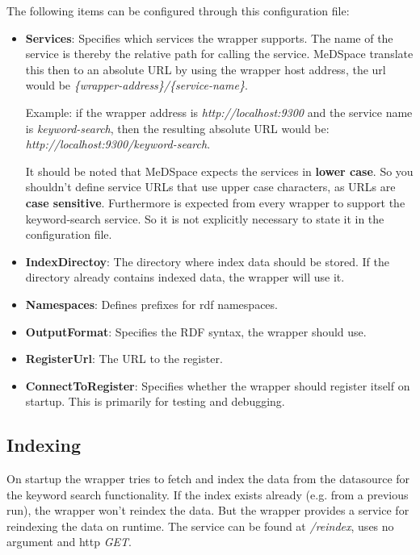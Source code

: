 The following items can be configured through this configuration file:
\begin{itemize}
\item \textbf{Services}: Specifies which services the wrapper supports. The name of the service is thereby the relative path for calling the service. MeDSpace translate this then to an absolute URL by using the wrapper host address, the url would be \emph{\{wrapper-address\}/\{service-name\}}. 

Example: if the wrapper address is \emph{http://localhost:9300} and the service  name is \emph{keyword-search}, then the resulting absolute URL would be: \emph{http://localhost:9300/keyword-search}. 

It should be noted that MeDSpace expects the services in \textbf{lower case}. So you shouldn't define service URLs that use upper case characters, as URLs are \textbf{case sensitive}.
Furthermore is expected from every wrapper to support the keyword-search service. So it is not explicitly necessary to state it in the configuration file.

\item \textbf{IndexDirectoy}: The directory where index data should be stored. If the directory already contains indexed data, the wrapper will use it.

\item \textbf{Namespaces}: Defines prefixes for rdf namespaces. 

\item \textbf{OutputFormat}: Specifies the RDF syntax, the wrapper should use.

\item \textbf{RegisterUrl}: The URL to the register.

\item \textbf{ConnectToRegister}: Specifies whether the wrapper should register itself on startup. This is primarily for testing and debugging.
\end{itemize}

\subsection{Indexing}

On startup the wrapper tries to fetch and index the data from the datasource for the keyword search functionality. If the index exists already (e.g. from a previous run), the wrapper won't reindex the data. But the wrapper provides a service for reindexing the data on runtime. The service can be found at \emph{/reindex}, uses no argument and http \emph{GET}.

